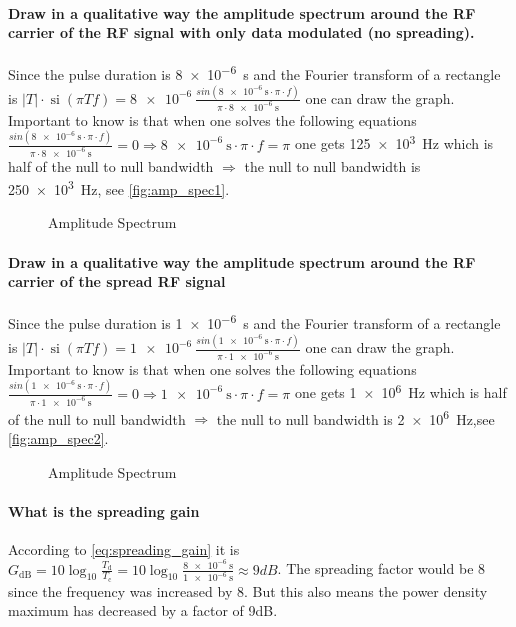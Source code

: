 \paragraph{Draw in a qualitative way the amplitude spectrum around the RF carrier of the RF signal with only data modulated (no spreading).}\mbox{} \newline
Since the pulse duration is \SI{8e-6}{\second} and the Fourier transform of a rectangle is $|T| \cdot \operatorname{si}(\pi T f)=\SI{8e-6}{}\frac{sin(\SI{8e-6}{\second} \cdot \pi \cdot f)}{\pi \cdot \SI{8e-6}{\second}}$ one can draw the graph. Important to know is that when one solves the following equations$\frac{sin(\SI{8e-6}{\second} \cdot \pi \cdot f)}{\pi \cdot \SI{8e-6}{\second}}=0 \Rightarrow \SI{8e-6}{\second} \cdot \pi \cdot f=\pi$ one gets \SI{125e3}{\hertz} which is half of the null to null bandwidth $\Rightarrow$ the null to null bandwidth is \SI{250e3}{\hertz}, see \autoref{fig:amp_spec1}.
\begin{figure}[ht!]
  \centering
  \caption{Amplitude Spectrum}
  \label{fig:amp_spec1}
\end{figure}
\paragraph{Draw in a qualitative way the amplitude spectrum around the RF carrier of the spread RF signal}\mbox{} \newline
Since the pulse duration is \SI{1e-6}{\second} and the Fourier transform of a rectangle is $|T| \cdot \operatorname{si}(\pi T f)=\SI{1e-6}{}\frac{sin(\SI{1e-6}{\second} \cdot \pi \cdot f)}{\pi \cdot \SI{1e-6}{\second}}$ one can draw the graph. Important to know is that when one solves the following equations$\frac{sin(\SI{1e-6}{\second} \cdot \pi \cdot f)}{\pi \cdot \SI{1e-6}{\second}}=0 \Rightarrow \SI{1e-6}{\second} \cdot \pi \cdot f=\pi$ one gets \SI{1e6}{\hertz} which is half of the null to null bandwidth $\Rightarrow$ the null to null bandwidth is \SI{2e6}{\hertz},see \autoref{fig:amp_spec2}.
\begin{figure}[ht!]
  \centering
  \caption{Amplitude Spectrum}
  \label{fig:amp_spec2}
\end{figure}
\paragraph{What is the spreading gain}\mbox{} \newline
According to \autoref{eq:spreading_gain} it is $G_{\mathrm{dB}}=10 \log _{10} \frac{T_{\mathrm{d}}}{T_{\mathrm{c}}}=10 \log _{10} \frac{\SI{8e-6}{\second}}{\SI{1e-6}{\second}} \approx 9dB$. The spreading factor would be 8 since the frequency was increased by 8. But this also means the power density maximum has decreased by a factor of 9dB.
